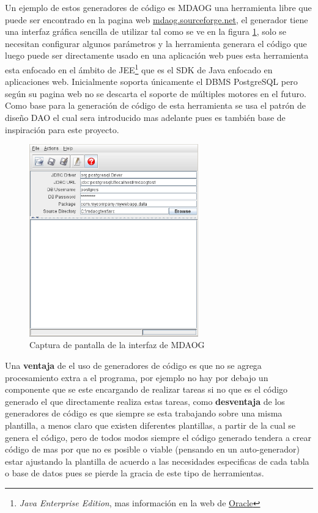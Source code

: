 Un ejemplo de estos generadores de código es MDAOG una herramienta libre que puede ser encontrado en la pagina web \href{http://mdaog.sourceforge.net/}{mdaog.sourceforge.net}, el generador tiene una interfaz gráfica sencilla de utilizar tal como se ve en la figura \ref{fig:mdaog}, solo se necesitan configurar algunos parámetros y la herramienta generara el código que luego puede ser directamente usado en una aplicación web pues esta herramienta esta enfocado en el ámbito de JEE\footnote{\textit{Java Enterprise Edition}, mas información en la web de \href{http://www.oracle.com/us/technologies/java/enterprise-edition/overview/index.html}{Oracle}} que es el SDK de Java enfocado en aplicaciones web. Inicialmente soporta únicamente el DBMS PostgreSQL pero según su pagina web no se descarta el soporte de múltiples motores en el futuro. Como base para la generación de código de esta herramienta se usa el patrón de diseño DAO el cual sera introducido mas adelante pues es también base de inspiración para este proyecto.  
%
\begin{figure}
  \centering
    \includegraphics[width=0.65\textwidth]{figuras/mdaogMetal.png}
  \caption{Captura de pantalla de la interfaz de MDAOG}
  \label{fig:mdaog}
\end{figure}

Una \textbf{ventaja} de el uso de generadores de código es que no se agrega procesamiento extra a el programa, por ejemplo no hay por debajo un componente que se este encargando de realizar tareas si no que es el código generado el que directamente realiza estas tareas, como \textbf{desventaja} de los generadores de código es que siempre se esta trabajando sobre una misma plantilla, a menos claro que existen diferentes plantillas, a partir de la cual se genera el código, pero de todos modos siempre el código generado tendera a crear código de mas por que no es posible o viable (pensando en un auto-generador) estar ajustando la plantilla de acuerdo a las necesidades especificas de cada tabla o base de datos pues se pierde la gracia de este tipo de herramientas.
%
